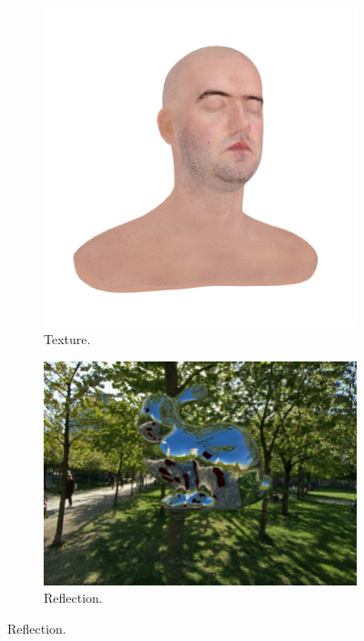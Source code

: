 \begin{figure}
	\centering
	\begin{subfigure}[b]{0.45\linewidth}
		\centering
		\includegraphics[width=\linewidth]{fig/texture.png}
		\caption{Texture.}
	\end{subfigure}
	\hfill
	\begin{subfigure}[b]{0.45\linewidth}
		\centering
		\includegraphics[width=\linewidth]{fig/reflection.png}
		\caption{Reflection.}
	\end{subfigure}
	

\end{figure}
